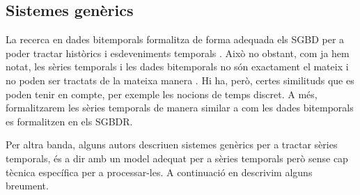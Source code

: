  


\subsection{Sistemes genèrics}


La recerca en dades bitemporals formalitza de forma adequada els
\gls{SGBD} per a poder tractar històrics i esdeveniments
temporals \parencite{jensen99:temporaldata,date02:_tempor_data_relat_model}. Això
no obstant, com ja hem notat, les sèries temporals i les dades
bitemporals no són exactament el mateix i no poden ser tractats de la
mateixa manera \parencite{schmidt95}. Hi ha, però, certes similituds
que es poden tenir en compte, per exemple les nocions de temps
discret. A més, formalitzarem les sèries temporals de manera similar a
com les dades bitemporals es formalitzen en els \gls{SGBDR}.



Per altra banda, alguns autors descriuen sistemes genèrics per a
tractar sèries temporals, és a dir amb un model adequat per a sèries
temporals però sense cap tècnica específica per a processar-les. A
continuació en descrivim alguns breument.




